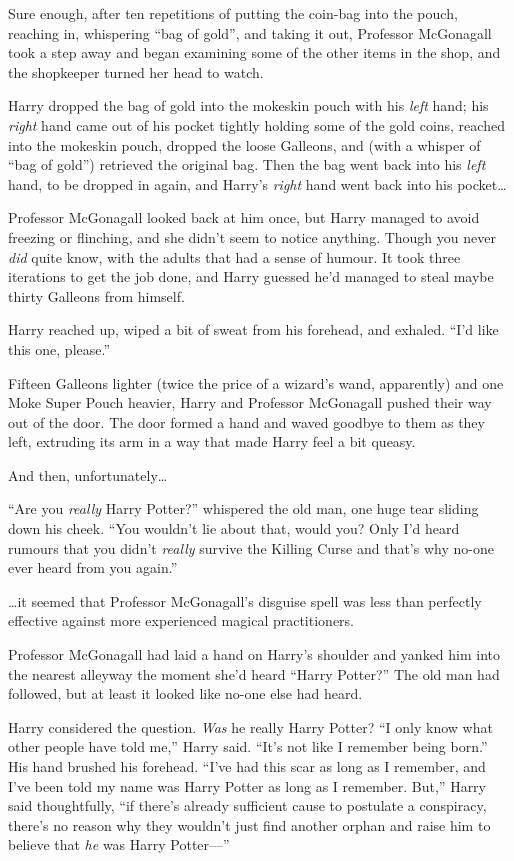 Sure enough, after ten repetitions of putting the coin-bag into the pouch, reaching in, whispering “bag of gold”, and taking it out, Professor McGonagall took a step away and began examining some of the other items in the shop, and the shopkeeper turned her head to watch.

Harry dropped the bag of gold into the mokeskin pouch with his \emph{left} hand; his \emph{right} hand came out of his pocket tightly holding some of the gold coins, reached into the mokeskin pouch, dropped the loose Galleons, and (with a whisper of “bag of gold”) retrieved the original bag. Then the bag went back into his \emph{left} hand, to be dropped in again, and Harry’s \emph{right} hand went back into his pocket…

Professor McGonagall looked back at him once, but Harry managed to avoid freezing or flinching, and she didn’t seem to notice anything. Though you never \emph{did} quite know, with the adults that had a sense of humour. It took three iterations to get the job done, and Harry guessed he’d managed to steal maybe thirty Galleons from himself.

Harry reached up, wiped a bit of sweat from his forehead, and exhaled.
“I’d like this one, please.”

Fifteen Galleons lighter (twice the price of a wizard’s wand, apparently) and one Moke Super Pouch  heavier, Harry and Professor McGonagall pushed their way out of the door. The door formed a hand and waved goodbye to them as they left, extruding its arm in a way that made Harry feel a bit queasy.

And then, unfortunately…

“Are you \emph{really} Harry Potter?” whispered the old man, one huge tear sliding down his cheek.
“You wouldn’t lie about that, would you? Only I’d heard rumours that you didn’t \emph{really} survive the Killing Curse and that’s why no-one ever heard from you again.”

…it seemed that Professor McGonagall’s disguise spell was less than perfectly effective against more experienced magical practitioners.

Professor McGonagall had laid a hand on Harry’s shoulder and yanked him into the nearest alleyway the moment she’d heard
“Harry Potter?” The old man had followed, but at least it looked like no-one else had heard.

Harry considered the question. \emph{Was} he really Harry Potter?
“I only know what other people have told me,” Harry said.
“It’s not like I remember being born.” His hand brushed his forehead.
“I’ve had this scar as long as I remember, and I’ve been told my name was Harry Potter as long as I remember. But,” Harry said thoughtfully, “if there’s already sufficient cause to postulate a conspiracy, there’s no reason why they wouldn’t just find another orphan and raise him to believe that \emph{he} was Harry Potter—”

